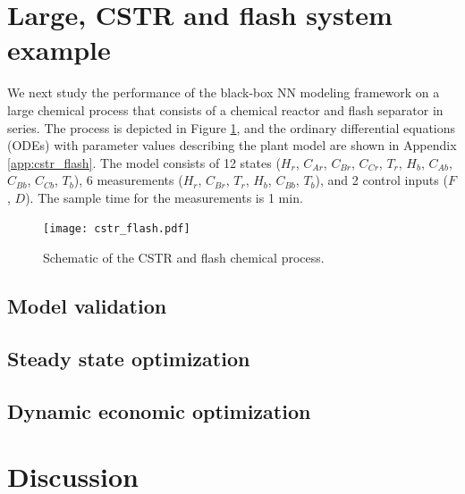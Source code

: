 \documentclass[10pt]{article}
\begin{document}
\section{Large, CSTR and flash system example}
We next study the performance of the black-box NN modeling framework on a large chemical process that consists of a chemical reactor and flash separator in series. The process is depicted in Figure \ref{fig:cstr_flash}, and the ordinary differential equations (ODEs) with parameter values describing the plant model are shown in Appendix \ref{app:cstr_flash}. The model consists of 12 states ($H_r$, $C_{Ar}$, $C_{Br}$, $C_{Cr}$, $T_r$, $H_b$, $C_{Ab}$, $C_{Bb}$, $C_{Cb}$, $T_b$), 6 measurements ($H_r$, $C_{Br}$, $T_r$, $H_b$, $C_{Bb}$, $T_b$), and 2 control inputs ($F$, $D$). The sample time for the measurements is 1 min.

\begin{figure}[!h]
  \centering
  \texttt{[image: cstr\_flash.pdf]}
  \caption{Schematic of the CSTR and flash chemical process.}
  \label{fig:cstr_flash}
\end{figure}

\subsection{Model validation}



\subsection{Steady state optimization}

\subsection{Dynamic economic optimization}


\section{Discussion}
\end{document}
